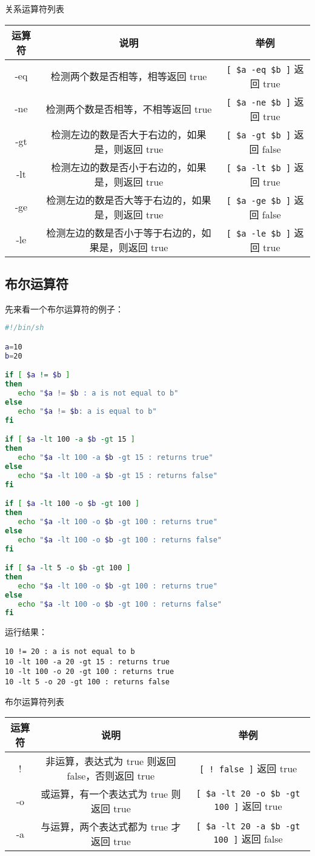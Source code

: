 关系运算符列表
\begin{center}
\begin{tabular}{c|c|c}
运算符&	说明	&举例\\
\hline
-eq	&检测两个数是否相等，相等返回 true	&\verb|[ $a -eq $b ]| 返回 true\\
-ne	&检测两个数是否相等，不相等返回 true	&\verb|[ $a -ne $b ]| 返回 true\\
-gt	&检测左边的数是否大于右边的，如果是，则返回 true&	\verb|[ $a -gt $b ]| 返回 false\\
-lt	&检测左边的数是否小于右边的，如果是，则返回 true	&\verb|[ $a -lt $b ]| 返回 true\\
-ge	&检测左边的数是否大等于右边的，如果是，则返回 true&\verb|[ $a -ge $b ]| 返回 false\\
-le	&检测左边的数是否小于等于右边的，如果是，则返回 true&\verb|[ $a -le $b ]| 返回 true
\end{tabular}
\end{center}


\subsection{布尔运算符}
先来看一个布尔运算符的例子：
\begin{lstlisting}[language=sh]
#!/bin/sh

a=10
b=20

if [ $a != $b ]
then
   echo "$a != $b : a is not equal to b"
else
   echo "$a != $b: a is equal to b"
fi

if [ $a -lt 100 -a $b -gt 15 ]
then
   echo "$a -lt 100 -a $b -gt 15 : returns true"
else
   echo "$a -lt 100 -a $b -gt 15 : returns false"
fi

if [ $a -lt 100 -o $b -gt 100 ]
then
   echo "$a -lt 100 -o $b -gt 100 : returns true"
else
   echo "$a -lt 100 -o $b -gt 100 : returns false"
fi

if [ $a -lt 5 -o $b -gt 100 ]
then
   echo "$a -lt 100 -o $b -gt 100 : returns true"
else
   echo "$a -lt 100 -o $b -gt 100 : returns false"
fi
\end{lstlisting}
运行结果：
\begin{verbatim}
10 != 20 : a is not equal to b
10 -lt 100 -a 20 -gt 15 : returns true
10 -lt 100 -o 20 -gt 100 : returns true
10 -lt 5 -o 20 -gt 100 : returns false
\end{verbatim}

布尔运算符列表
{\small
\begin{center}
\begin{tabular}{c|c|c}
运算符&	说明	&举例\\
\hline
!	&非运算，表达式为 true 则返回 false，否则返回 true&	\verb|[ ! false ]| 返回 true\\
-o	&或运算，有一个表达式为 true 则返回 true&	\verb|[ $a -lt 20 -o $b -gt 100 ]| 返回 true\\
-a	&与运算，两个表达式都为 true 才返回 true&	\verb|[ $a -lt 20 -a $b -gt 100 ]| 返回 false
\end{tabular}
\end{center}}


